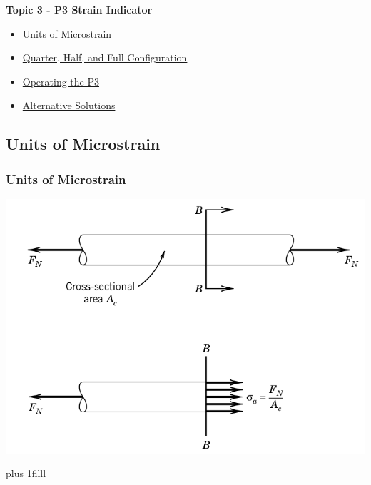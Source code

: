 \documentclass[fleqn]{beamer} %
\newcommand{\sectionIIItitle}{P3 Strain Indicator}
\newcommand{\sectionIIIsubsectionItitle}{Units of Microstrain}
\newcommand{\sectionIIIsubsectionIItitle}{Quarter, Half, and Full Configuration}
\newcommand{\sectionIIIsubsectionIIItitle}{Operating the P3}
\newcommand{\sectionIIIsubsectionIVtitle}{Alternative Solutions}
\newcommand{\btVFill}{\vskip0pt plus 1filll}
\begin{document}
		\begin{frame}
			\large \textbf{Topic 3 - \sectionIIItitle} \vspace{3mm}\\

			\begin{itemize}
				\item \hyperlink{sectionIIIsubsectionI}{\sectionIIIsubsectionItitle} \vspc %
				\item \hyperlink{sectionIIIsubsectionII}{\sectionIIIsubsectionIItitle} \vspc %
				\item \hyperlink{sectionIIIsubsectionIII}{\sectionIIIsubsectionIIItitle} \vspc %
				\item \hyperlink{sectionIIIsubsectionIV}{\sectionIIIsubsectionIVtitle} \vspc %
			\end{itemize}

		\end{frame}

		\subsection{\sectionIIIsubsectionItitle}\label{sectionIIIsubsectionI}

			\begin{frame}
				\frametitle{\sectionIIIsubsectionItitle}

				\bigskip

				\includegraphics[scale=.25]{images/strain_fig1.png}
			
				\btVFill
			

			\end{frame}
\end{document}
